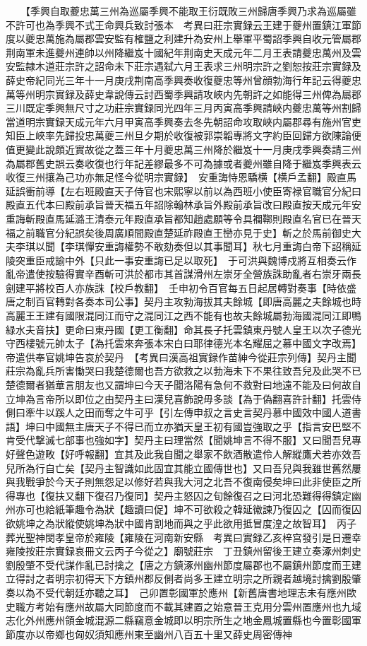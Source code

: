 　　【季興自取夔忠萬三州為巡屬季興不能取王衍既敗三州歸唐季興乃求為巡屬雖不許可也為季興不式王命興兵致討張本　考異曰莊宗實録云王建于夔州置鎮江軍節度以夔忠萬施為屬郡雲安監有榷鹽之利建升為安州上舉軍平蜀詔季興自收元管屬郡荆南軍未進夔州連帥以州降繼岌十國紀年荆南史天成元年二月王表請夔忠萬州及雲安監隸木道莊宗許之詔命未下莊宗遇弑六月王表求三州明宗許之劉恕按莊宗實録及薛史帝紀同光三年十一月庚戌荆南高季興奏收復夔忠等州曾顔勃海行年記云得夔忠萬等州明宗實録及薛史韋說傳云討西蜀季興請攻峽内先朝許之如能得三州俾為屬郡三川既定季興無尺寸之功莊宗實録同光四年三月丙寅高季興請峽内夔忠萬等州割歸當道明宗實録天成元年六月甲寅高季興奏去冬先朝詔命攻取峽内屬郡尋有施州官吏知臣上峽率先歸投忠萬夔三州旦夕期於收復被郭崇韜專將文字約臣回歸方欲陳論便值更變此說頗近實故從之蓋三年十月夔忠萬三州降於繼岌十一月庚戌季興奏請三州為屬郡舊史誤云奏收復也行年記差繆最多不可為據或者夔州雖自降于繼岌季興表云收復三州攘為己功亦無足怪今從明宗實録】　安重誨恃恩驕横【横戶孟翻】殿直馬延誤衝前導【左右班殿直天子侍官也宋熙寧以前以為西班小使臣寄禄官職官分紀曰殿直五代本曰殿前承旨晉天福五年詔除翰林承旨外殿前承旨改曰殿直按天成元年安重誨斬殿直馬延潞王清泰元年殿直承旨都知趙處願等令具襴鞹則殿直名官已在晉天福之前職官分紀誤矣後周廣順間殿直楚延祚殿直王巒亦見于史】斬之於馬前御史大夫李琪以聞【李琪憚安重誨權勢不敢劾奏但以其事聞耳】秋七月重誨白帝下詔稱延陵突重臣戒諭中外【只此一事安重誨已足以取死】　于可洪與魏博戍將互相奏云作亂帝遣使按驗得實辛酉斬可洪於都市其首謀滑州左崇牙全營族誅助亂者右崇牙兩長劍建平將校百人亦族誅【校戶教翻】　壬申初令百官每五日起居轉對奏事【時依盛唐之制百官轉對各奏本司公事】契丹主攻勃海拔其夫餘城【即唐高麗之夫餘城也時高麗王王建有國限混同江而守之混同江之西不能有也故夫餘城屬勃海國混同江即鴨緑水夫音扶】更命曰東丹國【更工衡翻】命其長子托雲鎮東丹號人皇王以次子德光守西樓號元帥太子【為托雲來奔張本宋白曰耶律德光本名耀屈之慕中國文字改焉】帝遣供奉官姚坤告哀於契丹　【考異曰漢高祖實録作苗紳今從莊宗列傳】契丹主聞莊宗為亂兵所害慟哭曰我楚德爾也吾方欲救之以勃海未下不果往致吾兒及此哭不已楚德爾者猶華言朋友也又謂坤曰今天子聞洛陽有急何不救對曰地遠不能及曰何故自立坤為言帝所以即位之由契丹主曰漢兒喜飾說毋多談【為于偽翻喜許計翻】托雲侍側曰牽牛以蹊人之田而奪之牛可乎【引左傳申叔之言史言契丹慕中國效中國人道書語】坤曰中國無主唐天子不得已而立亦猶天皇王初有國豈強取之乎【指言安巴堅不肯受代撃滅七部事也強如字】契丹主曰理當然【聞姚坤言不得不服】又曰聞吾兒專好聲色遊畋【好呼報翻】宜其及此我自聞之舉家不飲酒散遣伶人解縱鷹犬若亦效吾兒所為行自亡矣【契丹主智識如此固宜其能立國傳世也】又曰吾兒與我雖世舊然屢與我戰爭於今天子則無怨足以修好若與我大河之北吾不復南侵矣坤曰此非使臣之所得專也【復扶又翻下復召乃復同】契丹主怒囚之旬餘復召之曰河北恐難得得鎮定幽州亦可也給紙筆趣令為狀【趣讀曰促】坤不可欲殺之韓延徽諫乃復囚之【囚而復囚欲姚坤之為狀縱使姚坤為狀中國肯割地而與之乎此欲用抵冒度湟之故智耳】　丙子葬光聖神閔孝皇帝於雍陵【雍陵在河南新安縣　考異曰實録乙亥梓宫發引是日遷幸雍陵按莊宗實録哀冊文云丙子今從之】廟號莊宗　丁丑鎮州留後王建立奏涿州刺史劉殷肇不受代謀作亂已討擒之【唐之方鎮涿州幽州節度屬郡也不屬鎮州節度而王建立得討之者明宗初得天下方鎮州郡反側者尚多王建立明宗之所親者越境討擒劉殷肇奏以為不受代朝廷亦聽之耳】　己卯置彰國軍於應州【新舊唐書地理志未有應州歐史職方考始有應州故屬大同節度而不載其建置之始意晉王克用分雲州置應州也九域志化外州應州領金城混源二縣竊意金城即以明宗所生之地金鳳城置縣也今置彰國軍節度亦以帝鄉也匈奴須知應州東至幽州八百五十里又薛史周密傳神